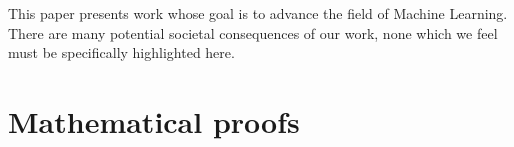 \documentclass{article}
\theoremstyle{plain}
\theoremstyle{definition}
\theoremstyle{remark}
\begin{document}
This paper presents work whose goal is to advance the field of 
Machine Learning. There are many potential societal consequences 
of our work, none which we feel must be specifically highlighted here.

%
%
%
%




\newpage
\appendix
\onecolumn



\setcounter{equation}{0}
\setcounter{figure}{0}
\setcounter{table}{0}
\makeatletter
\renewcommand{\theequation}{S\arabic{equation}}
\renewcommand{\thefigure}{S\arabic{figure}}
\renewcommand{\bibnumfmt}[1]{[S#1]}
\renewcommand{\citenumfont}[1]{S#1}

\section{Mathematical proofs}
\label{sec-proof-statements}

\end{document}

